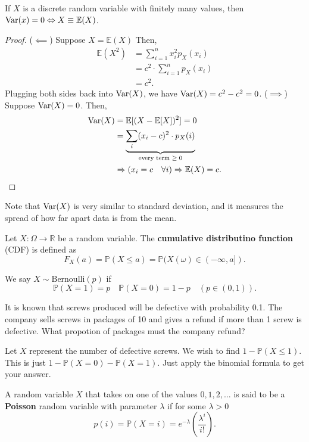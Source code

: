 \begin{prop}
	If \( X \) is a discrete random variable with finitely many values, then \( \operatorname{Var}(x) = 0 \Leftrightarrow X \equiv \mathbb{E}(X) \).
\end{prop}
\begin{proof}
	(\( \impliedby \)) Suppose \( X=\mathbb{E}(X) \) Then,
	\begin{align*}
		\mathbb{E}(X^{2} ) &= \sum_{i=1}^{n} x_{i}^{2}p_X(x_i)  \\
		&= c^{2}\cdot \sum_{i=1}^{n} p_X(x_i)  \\
		&= c^{2}
	.\end{align*}
	Plugging both sides back into \( \operatorname{Var}(X) \), we have \( \operatorname{Var}(X) = c^{2} - c^{2} = 0   \). (\( \implies \)) Suppose \( \operatorname{Var}(X) = 0 \). Then, 
	\begin{align*}
		\operatorname{Var}(X) &= \mathbb{E}[(X - \mathbb{E}[X] )^{2} ] = 0\\
						&= \underbrace{\sum_{i}(x_i - c)^{2} \cdot p_X(i)}_{\text{every term \( \ge 0 \)}}  \\
						&\Rightarrow (x_i = c \quad \forall i) \Rightarrow \mathbb{E}(X) = c
	.\end{align*}
\end{proof}

Note that \( \operatorname{Var}(X) \) is very similar to standard deviation, and it measures the spread of how far apart data is from the mean.

\begin{definition}
	Let \( X:\Omega \to \mathbb{R} \) be a random variable. The \textbf{cumulative distributino function} (CDF) is defined as \[
		F_X(a) = \mathbb{P}(X \le a) = \mathbb{P}(X(\omega ) \in (-\infty, a])
	.\] 
\end{definition}

\begin{definition}
	We say \( X \sim \text{Bernoulli}(p) \) if \[
		\mathbb{P}(X=1) = p \quad \mathbb{P}(X=0) = 1-p \quad (p \in (0,1))
	.\] 
\end{definition}

\begin{eg}
	It is known that screws produced will be defective with probability 0.1. The company sells screws in packages of 10 and gives a refund if more than 1 screw is defective. What propotion of packages must the company refund?
\end{eg}
\begin{explanation}
	Let \( X \) represent the number of defective screws. We wish to find \( 1-\mathbb{P}(X\le 1) \). This is just \( 1 - \mathbb{P}(X=0) - \mathbb{P}(X = 1) \). Just apply the binomial formula to get your answer.
\end{explanation}

\begin{definition}
	A random variable \( X \) that takes on one of the values \(0,1,2,\ldots \) is said to be a \textbf{Poisson} random variable with parameter \( \lambda  \) if for some \( \lambda >0 \)
	\[
		p(i) = \mathbb{P}(X=i) = e^{-\lambda } \left( \frac{\lambda ^{i}}{i!}  \right) 
	.\] 
\end{definition}
